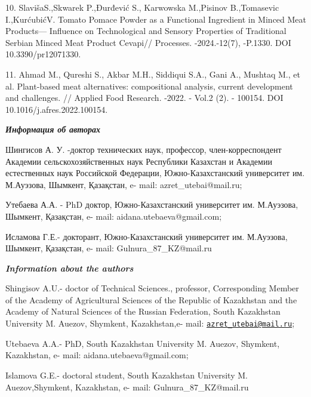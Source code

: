 10. SlavišaS.,Skwarek P.,Đurđević S., Karwowska M.,Pisinov B.,Tomasevic
I.,KurćubićV. Tomato Pomace Powder as a Functional Ingredient in Minced
Meat Products--- Influence on Technological and Sensory Properties of
Traditional Serbian Minced Meat Product Cevapi// Processes.
-2024.-12(7), -P.1330. DOI 10.3390/pr12071330.

11. Ahmad M., Qureshi S., Akbar M.H., Siddiqui S.A., Gani A., Mushtaq
M., et al. Plant-based meat alternatives: compositional analysis,
current development and challenges. // Applied Food Research. -2022. -
Vol.2 (2). - 100154. DOI 10.1016/j.afres.2022.100154.

\emph{{\bfseries Информация об авторах}}

Шингисов А. У. -доктор технических наук, профессор, член-корреспондент
Академии сельскохозяйственных наук Республики Казахстан и Академии
естественных наук Российской Федерации, Южно-Казахстанский университет
им. М.Ауэзова, Шымкент, Қазақстан, e- mail: azret\_utebai@mail.ru;

Утебаева А.А. - PhD доктор, Южно-Казахстанский университет им.
М.Ауэзова, Шымкент, Қазақстан, e- mail: aidana.utebaeva@gmail.com;

Исламова Г.Е.- докторант, Южно-Казахстанский университет им. М.Ауэзова,
Шымкент, Қазақстан, e- mail: Gulnura\_87\_KZ@mail.ru

\emph{{\bfseries Information about the authors}}

Shingisov A.U.- doctor of Technical Sciences., professor, Corresponding
Member of the Academy of Agricultural Sciences of the Republic of
Kazakhstan and the Academy of Natural Sciences of the Russian
Federation, South Kazakhstan University M. Auezov, Shymkent,
Kazakhstan,e- mail:
\href{mailto:azret_utebai@mail.ru}{\nolinkurl{azret\_utebai@mail.ru}};

Utebaeva A.A.- PhD, South Kazakhstan University M. Auezov, Shymkent,
Kazakhstan, e- mail: aidana.utebaeva@gmail.com;

Islamova G.E.- doctoral student, South Kazakhstan University M.
Auezov,Shymkent, Kazakhstan, e- mail: Gulnura\_87\_KZ@mail.ru\
